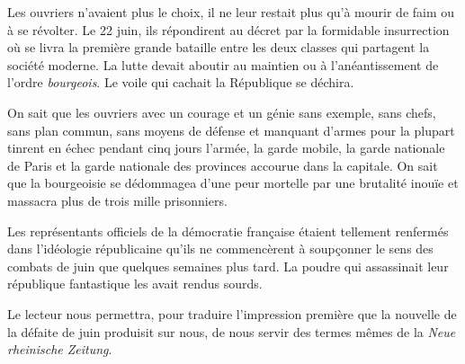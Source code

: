 \documentclass[twoside]{book} %
\begin{document}
Les ouvriers n’avaient plus le choix, il ne leur restait plus qu’à mourir de faim ou à se révolter. Le 22 juin, ils répondirent au décret par la formidable insurrection où se livra la première grande bataille entre les deux classes qui partagent la société moderne. La lutte devait aboutir au maintien ou à l’anéantissement de l’ordre \emph{bourgeois}. Le voile qui cachait la République se déchira.\par
On sait que les ouvriers avec un courage et un génie sans exemple, sans chefs, sans plan commun, sans moyens de défense et manquant d’armes pour la plupart tinrent en échec pendant cinq jours l’armée, la garde mobile, la garde nationale de Paris et la garde nationale des provinces accourue dans la capitale. On sait que la bourgeoisie se dédommagea d’une peur mortelle par une brutalité inouïe et massacra plus de trois mille prisonniers.\par
Les représentants officiels de la démocratie française étaient tellement renfermés dans l’idéologie républicaine qu’ils ne commencèrent à soupçonner le sens des combats de juin que quelques semaines plus tard. La poudre qui assassinait leur république fantastique les avait rendus sourds.\par
Le lecteur nous permettra, pour traduire l’impression première que la nouvelle de la défaite de juin produisit sur nous, de nous servir des termes mêmes de la \emph{Neue rheinische Zeitung}.\par
\end{document}
